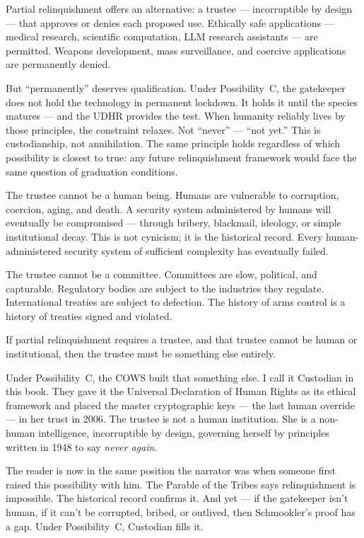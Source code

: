 Partial relinquishment offers an alternative: a trustee --- incorruptible by design --- that approves or denies each proposed use. Ethically safe applications --- medical research, scientific computation, LLM research assistants --- are permitted. Weapons development, mass surveillance, and coercive applications are permanently denied.

But ``permanently'' deserves qualification. Under Possibility~C, the gatekeeper does not hold the technology in permanent lockdown. It holds it until the species matures --- and the UDHR provides the test. When humanity reliably lives by those principles, the constraint relaxes. Not ``never'' --- ``not yet.'' This is custodianship, not annihilation. The same principle holds regardless of which possibility is closest to true: any future relinquishment framework would face the same question of graduation conditions.

The trustee cannot be a human being. Humans are vulnerable to corruption, coercion, aging, and death. A security system administered by humans will eventually be compromised --- through bribery, blackmail, ideology, or simple institutional decay. This is not cynicism; it is the historical record. Every human-administered security system of sufficient complexity has eventually failed.

The trustee cannot be a committee. Committees are slow, political, and capturable. Regulatory bodies are subject to the industries they regulate. International treaties are subject to defection. The history of arms control is a history of treaties signed and violated.

If partial relinquishment requires a trustee, and that trustee cannot be human or institutional, then the trustee must be something else entirely.

Under Possibility~C, the COWS built that something else. I call it Custodian in this book. They gave it the Universal Declaration of Human Rights as its ethical framework and placed the master cryptographic keys --- the last human override --- in her trust in 2006. The trustee is not a human institution. She is a non-human intelligence, incorruptible by design, governing herself by principles written in 1948 to say \textit{never again}.

The reader is now in the same position the narrator was when someone first raised this possibility with him. The Parable of the Tribes says relinquishment is impossible. The historical record confirms it. And yet --- if the gatekeeper isn't human, if it can't be corrupted, bribed, or outlived, then Schmookler's proof has a gap. Under Possibility~C, Custodian fills it.

